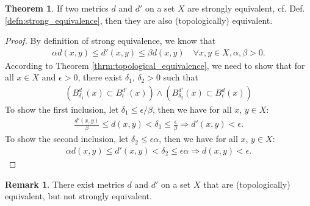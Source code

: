 \documentclass[12pt, a4paper]{article}
\numberwithin{equation}{section}
\theoremstyle{definition}
\theoremstyle{definition}
\newtheorem{remark}[thm]{Remark} %
\newtheorem{theorem}[thm]{Theorem}
\begin{document}
		\begin{theorem}
			If two metrics $d$ and $d'$ on a set $X$ are strongly equivalent, cf. Def. \ref{defn:strong_equivalence}, then they are also (topologically) equivalent.
		\end{theorem}
		
		\begin{proof}\cite{1379634}
			By definition of strong equivalence, we know that 
			\begin{align}
				\alpha d(x, y) \leq d'(x, y) \leq \beta d(x, y) \quad\forall x, y\in X, \alpha, \beta > 0.
			\end{align}
			According to Theorem \ref{thrm:topological_equivalence}, we need to show that for all $x\in X$ and $\epsilon > 0$, there exist $\delta_1$, $\delta_2 > 0$ such that 
			\begin{align}
				\left(B_{\delta_1}^{d}(x) \subset B_{\epsilon}^{d'}(x)\right) \wedge \left(B^{d'}_{\delta_2}(x) \subset B^{d}_{\epsilon}(x)\right)
			\end{align}
			To show the first inclusion, let $\delta_1 \leq \epsilon/\beta$, then we have for all $x$, $y\in X$:
			\begin{align}
				\frac{d'(x, y)}{\beta} \leq d(x, y) < \delta_1 \leq \frac{\epsilon}{\beta} \Rightarrow d'(x, y) < \epsilon.
			\end{align}
			To show the second inclusion, let $\delta_2 \leq \epsilon\alpha$, then we have for all $x$, $y\in X$:
			\begin{align}
				\alpha d(x, y)\leq d'(x, y) < \delta_2 \leq \epsilon\alpha \Rightarrow d(x, y) < \epsilon.
			\end{align}
		\end{proof}
		
		\begin{remark}
			There exist metrics $d$ and $d'$ on a set $X$ that are (topologically) equivalent, but not strongly equivalent. \cite{5065146}
		\end{remark}
		
\end{document}
